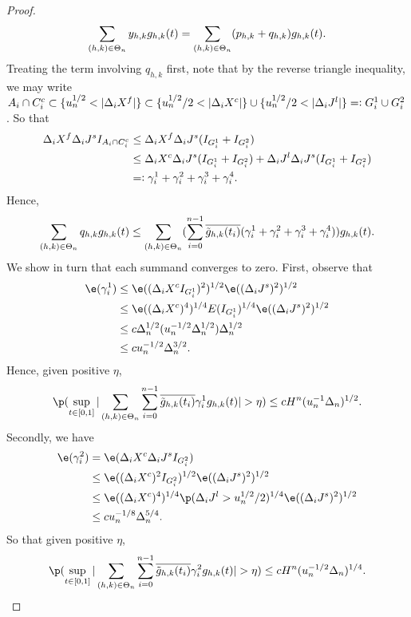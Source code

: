 \begin{proof}
\begin{align}
  \sum_{(h,k) \in \Theta_n} y_{h,k} g_{h,k}(t)  = \sum_{(h,k) \in \Theta_n} (p_{h,k} + q_{h,k}) g_{h,k}(t).\notag
\end{align}
Treating the term involving $q_{h,k}$ first, note that by the reverse triangle inequality, we may  write $A_i \cap C_i^c \subset \{ u_n^{1/2} < \vert \Delta_i X^f \vert  \} \subset \{ u_n^{1/2}/2 < \vert \Delta_i X^c \vert  \} \cup  \{ u_n^{1/2}/2 < \vert \Delta_i J^l \vert  \} =: G^1_i \cup G^2_i\notag$. So that 
\begin{align}
  \Delta_i X^f \Delta_i J^s I_{A_i \cap C_i^c} &\le \Delta_i X^f \Delta_i J^s  (I_{G^1_i} +  I_{G^2_i}) \notag\\
  & \le \Delta_i X^c \Delta_i J^s(I_{G^1_i} +  I_{G^2_i}) + \Delta_i J^l \Delta_i J^s(I_{G^1_i} +  I_{G^2_i}) \notag \\
  & =: \gamma_i^1 + \gamma_i^2 + \gamma_i^3 + \gamma^4_i.\notag 
\end{align}
Hence, \begin{align} \notag \sum_{(h,k) \in \Theta_n} q_{h,k} g_{h,k}(t) \le \sum_{(h,k) \in \Theta_n} (\sum_{i = 0}^{n-1} \overline{\tilde{g}_{h,k}(t_i)} (\gamma_i^1 + \gamma_i^2 + \gamma_i^3 + \gamma^4_i)) g_{h,k}(t). \end{align} We show in turn that each summand converges to zero. First, observe that
\begin{align}
  \e(\gamma_i^1) &\le  \e( (\dxc  I_{G^1_i})^2)^{1/2} \e( (\djt)^2)^{1/2} \notag\\
  &\le  \e( (\dxc)^4)^{1/4}  E(I_{G^1_i})^{1/4} \e( (\djt)^2)^{1/2} \notag\\
  & \le c \Delta_n^{1/2} (u^{-1/2}_n \Delta_n^{1/2}) \Delta_n^{1/2} \notag \\
  & \le c u^{-1/2}_n \Delta_n^{3/2}.
  \label{}
\end{align}
Hence, given positive $\eta$, 
\begin{align} 
  \p( \sup_{t \in \domain}\vert \sumt \sumin \btghki \gamma^1_i \ghk(t)\vert > \eta) \le cH^n (u^{-1}_n\Delta_n)^{1/2}. \label{eq:g1} \end{align}
Secondly, we have 
\begin{align}
  \e(\gamma_i^2) & =  \e(\dxc \djt I_{G^2_i}) \notag\\
  & \le \e((\dxc)^2 I_{G^2_i})^{1/2} \e((\djt)^2)^{1/2}\notag \\
  &\le \e((\dxc)^4)^{1/4} \p(\djl > u_n^{1/2}/2)^{1/4} \e((\djt)^2)^{1/2}\notag\\
  & \le  c u^{-1/8}_n \Delta_n^{5/4}. \notag
\end{align}
So that given positive $\eta$,
\begin{align} 
  \label{eq:g2}
  \p( \sup_{t \in \domain}\vert \sumt \sumin \btghki \gamma^2_i \ghk(t)\vert > \eta) \le cH^n (u^{-1/2}_n\Delta_n)^{1/4}.  \end{align}

\end{proof}
